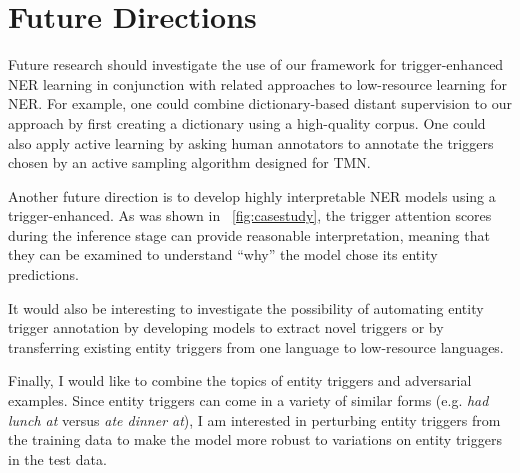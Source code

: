 




\section{Future Directions}
Future research should investigate the use of our framework for trigger-enhanced NER learning in conjunction with related approaches to low-resource learning for NER. 
For example, one could combine dictionary-based distant supervision to our approach by first creating a dictionary using a high-quality corpus. One could also apply active learning by asking human annotators to annotate the triggers chosen by an active sampling algorithm designed for TMN.

Another future direction is to develop highly interpretable NER models using a trigger-enhanced. As was shown in ~\ref{fig:casestudy}, the trigger attention scores during the inference stage can provide reasonable interpretation, meaning that they can be examined to understand ``why'' the model chose its entity predictions. %

It would also be interesting to investigate the possibility of automating entity trigger annotation by developing models to extract novel triggers or by transferring existing entity triggers from one language to low-resource languages.

Finally, I would like to combine the topics of entity triggers and adversarial examples. Since entity triggers can come in a  variety of similar forms (e.g. \textit{had lunch at} versus \textit{ate  dinner  at}), I am interested in perturbing entity triggers from the training data to make the model more robust to variations on entity triggers in the test data.